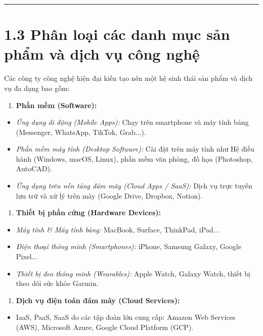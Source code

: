 \documentclass[11pt,a4paper,oneside]{report}
\begin{document}
\bigskip\hrule\bigskip

\section{1.3 Phân loại các danh mục sản phẩm và dịch vụ công nghệ}

Các công ty công nghệ hiện đại kiến tạo nên một hệ sinh thái sản phẩm và dịch vụ đa dạng bao gồm:

\begin{enumerate}[leftmargin=1.5em]
\item \textbf{Phần mềm (Software):}
\end{enumerate}
\begin{itemize}[leftmargin=1.5em]
\item \textit{Ứng dụng di động (Mobile Apps):} Chạy trên smartphone và máy tính bảng (Messenger, WhatsApp, TikTok, Grab...).
\item \textit{Phần mềm máy tính (Desktop Software):} Cài đặt trên máy tính như Hệ điều hành (Windows, macOS, Linux), phần mềm văn phòng, đồ họa (Photoshop, AutoCAD).
\item \textit{Ứng dụng trên nền tảng đám mây (Cloud Apps / SaaS):} Dịch vụ trực tuyến lưu trữ và xử lý trên mây (Google Drive, Dropbox, Notion).
\end{itemize}
\begin{enumerate}[leftmargin=1.5em]
\item \textbf{Thiết bị phần cứng (Hardware Devices):}
\end{enumerate}
\begin{itemize}[leftmargin=1.5em]
\item \textit{Máy tính \& Máy tính bảng:} MacBook, Surface, ThinkPad, iPad...
\item \textit{Điện thoại thông minh (Smartphones):} iPhone, Samsung Galaxy, Google Pixel...
\item \textit{Thiết bị đeo thông minh (Wearables):} Apple Watch, Galaxy Watch, thiết bị theo dõi sức khỏe Garmin.
\end{itemize}
\begin{enumerate}[leftmargin=1.5em]
\item \textbf{Dịch vụ điện toán đám mây (Cloud Services):}
\end{enumerate}
\begin{itemize}[leftmargin=1.5em]
\item IaaS, PaaS, SaaS do các tập đoàn lớn cung cấp: Amazon Web Services (AWS), Microsoft Azure, Google Cloud Platform (GCP).
\end{itemize}
\end{document}
